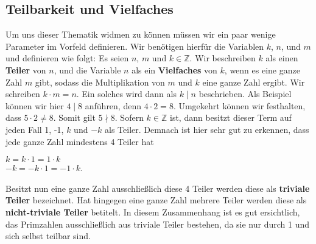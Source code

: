 \documentclass[12pt,a4paper]{article}
\theoremstyle{definition}
\begin{document}
\subsection{Teilbarkeit und Vielfaches}\label{Teilbarkeit und Vielfaches}
Um uns dieser Thematik widmen zu können müssen wir ein paar wenige Parameter im Vorfeld definieren.\newline
Wir benötigen hierfür die Variablen $k$, $n$, und $m$ und definieren wie folgt:\newline
Es seien $n$, $m$ und $k \in \mathbb{Z}$.
Wir beschreiben $k$ als einen \textbf{Teiler} von $n$, und die Variable $n$ als ein \textbf{Vielfaches} von $k$, wenn es eine ganze Zahl $m$ gibt, sodass die Multiplikation von $m$ und $k$ eine ganze Zahl ergibt.
Wir schreiben $k\cdot{m} = n$. Ein solches wird dann als $k \mid n$ beschrieben.\newline
Als Beispiel können wir hier $4 \mid 8$ anführen, denn $4 \cdot 2 = 8$.
Umgekehrt können wir festhalten, dass $5 \cdot 2 \neq 8$. Somit gilt $5 \nmid 8.$ \newline
Sofern $k \in \mathbb{Z}$ ist, dann besitzt dieser Term auf jeden Fall 1, -1, $k$ und $-k$ als Teiler.
Demnach ist hier sehr gut zu erkennen, dass jede ganze Zahl mindestens 4 Teiler hat
\begin{center}
$k = k \cdot 1 = 1 \cdot k$\\
$-k = -k \cdot 1 = -1 \cdot k$.
\end{center}
Besitzt nun eine ganze Zahl ausschließlich diese 4 Teiler werden diese als \textbf{triviale Teiler} bezeichnet.
Hat hingegen eine ganze Zahl mehrere Teiler werden diese als \textbf{nicht-triviale Teiler} betitelt.
In diesem Zusammenhang ist es gut ersichtlich, das Primzahlen ausschließlich aus triviale Teiler bestehen, da sie nur durch 1 und sich selbst teilbar sind.
\end{document}
